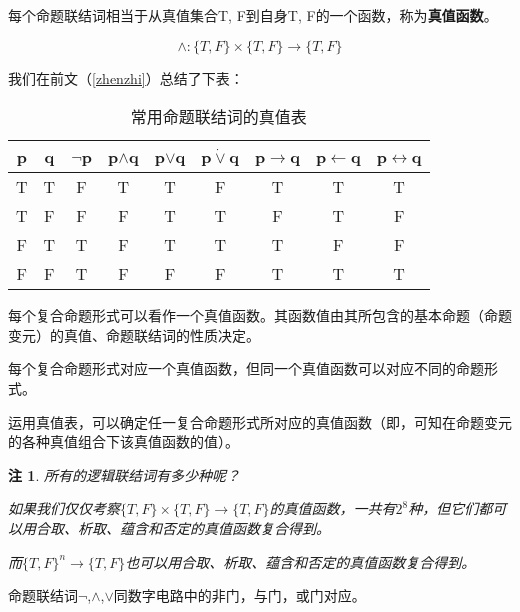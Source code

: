\documentclass[12pt,onecolumn,a4paper]{book}
\newtheorem*{note}{注}
\numberwithin{table}{subsection}
\numberwithin{equation}{subsection}
\begin{document}
每个命题联结词相当于从真值集合{T, F}到自身{T, F}的一个函数，称为\textbf{真值函数}。

$$\wedge:\{T, F\}\times\{T, F\} \rightarrow \{T, F\}$$


我们在前文（\ref{zhenzhi}）总结了下表：
\begin{table}[h]
    \centering
    \begin{tabular}{cc|ccccccc}
        \toprule
        p & q & $\neg$p & p$\wedge$q & p$\vee$q & p$\dot{\vee}$q & p$\rightarrow$q & p$\leftarrow$q & p$\leftrightarrow$q \\
        \midrule
        T & T & F & T & T & F & T & T & T \\
        T & F & F & F & T & T & F & T & F \\
        F & T & T & F & T & T & T & F & F \\
        F & F & T & F & F & F & T & T & T \\
        \bottomrule
    \end{tabular}
    \caption{常用命题联结词的真值表}
\end{table}

每个复合命题形式可以看作一个真值函数。其函数值由其所包含的基本命题（命题变元）的真值、命题联结词的性质决定。

每个复合命题形式对应一个真值函数，但同一个真值函数可以对应不同的命题形式。

运用真值表，可以确定任一复合命题形式所对应的真值函数（即，可知在命题变元的各种真值组合下该真值函数的值）。

\begin{note}
    所有的逻辑联结词有多少种呢？

    如果我们仅仅考察$\{T, F\}\times\{T, F\} \rightarrow \{T, F\}$的真值函数，一共有$2^8$种，但它们都可以用合取、析取、蕴含和否定的真值函数复合得到。

    而$\{T, F\}^n \rightarrow \{T, F\}$也可以用合取、析取、蕴含和否定的真值函数复合得到。\label{compose}
\end{note}

命题联结词$\neg$,$\wedge$,$\vee$同数字电路中的非门，与门，或门对应。
\end{document}
